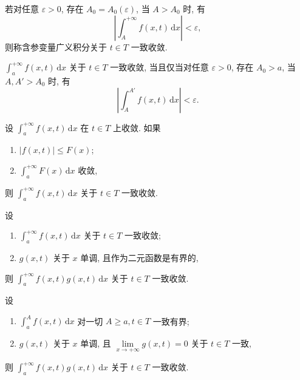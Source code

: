 \begin{definition}
    若对任意 $\varepsilon>0$, 存在 $A_0=A_0(\varepsilon)$, 当 $A>A_0$ 时, 有
    \[
        \left|\int_A^{+\infty}f(x,t)\,\mathrm{d}x\right|<\varepsilon,
    \]
    则称含参变量广义积分关于 $t\in T$ 一致收敛.
\end{definition}

\begin{theorem}
    $\displaystyle\int_a^{+\infty}f(x,t)\,\mathrm{d}x$ 关于 $t\in T$ 一致收敛, 当且仅当对任意 $\varepsilon>0$, 存在 $A_0>a$, 当 $A,A'>A_0$ 时, 有
    \[
        \left|\int_A^{A'}f(x,t)\,\mathrm{d}x\right|<\varepsilon.
    \]
\end{theorem}

\begin{theorem}
    设 $\displaystyle\int_a^{+\infty}f(x,t)\,\mathrm{d}x$ 在 $t\in T$ 上收敛. 如果
    \begin{enumerate}
        \item $|f(x,t)|\leq F(x)$;
        \item $\displaystyle\int_a^{+\infty}F(x)\,\mathrm{d}x$ 收敛,
    \end{enumerate}
    则 $\displaystyle\int_a^{+\infty}f(x,t)\,\mathrm{d}x$ 关于 $t\in T$ 一致收敛.
\end{theorem}

\begin{theorem}
    设
    \begin{enumerate}
        \item $\displaystyle\int_a^{+\infty}f(x,t)\,\mathrm{d}x$ 关于 $t\in T$ 一致收敛;
        \item $g(x,t)$ 关于 $x$ 单调, 且作为二元函数是有界的,
    \end{enumerate}
    则 $\displaystyle\int_a^{+\infty}f(x,t)g(x,t)\,\mathrm{d}x$ 关于 $t\in T$ 一致收敛.
\end{theorem}

\begin{theorem}
    设
    \begin{enumerate}
        \item $\displaystyle\int_a^A f(x,t)\,\mathrm{d}x$ 对一切 $A\geq a,t\in T$ 一致有界;
        \item $g(x,t)$ 关于 $x$ 单调, 且 $\displaystyle\lim\limits_{x\to+\infty}g(x,t)=0$ 关于 $t\in T$ 一致,
    \end{enumerate}
    则 $\displaystyle\int_a^{+\infty}f(x,t)g(x,t)\,\mathrm{d}x$ 关于 $t\in T$ 一致收敛.
\end{theorem}


